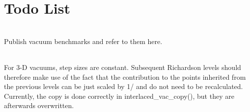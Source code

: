 \chapter{Todo List }
\hypertarget{todo}{}\label{todo}

\begin{DoxyRefList}
\item[{\parbox[t]{\linewidth}{Module \doxylink{namespacevac__ops}{vac\+\_\+ops} }}]\hfill \\
\label{todo__todo000001}%
%
Publish vacuum benchmarks and refer to them here.  
\item[{\parbox[t]{\linewidth}{Subprogram \doxylink{namespacevac__ops_a8d70ea940b7548e4a2f397699c694b67}{vac\+\_\+ops::calc\+\_\+gh} (vac, n\+\_\+r\+\_\+in, lims\+\_\+r\+\_\+in, x\+\_\+vec\+\_\+in, g\+\_\+in, h\+\_\+in)}}]\hfill \\
\label{todo__todo000002}%
%
For 3-\/D vacuums, step sizes are constant. Subsequent Richardson levels should therefore make use of the fact that the contribution to the points inherited from the previous levels can be just scaled by 1/ and do not need to be recalculated. Currently, the copy is done correctly in interlaced\+\_\+vac\+\_\+copy(), but they are afterwards overwritten.
\end{DoxyRefList}